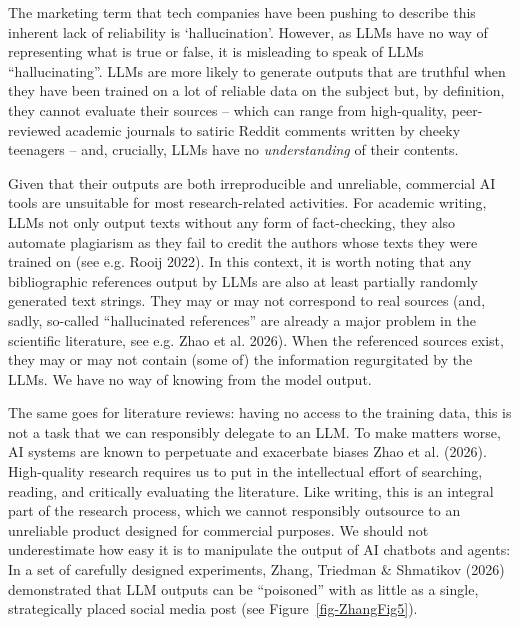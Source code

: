 \documentclass[
  letterpaper,
  DIV=11,
  numbers=noendperiod]{scrreprt}
\begin{document}
The marketing term that tech companies have been pushing to describe
this inherent lack of reliability is `hallucination'. However, as LLMs
have no way of representing what is true or false, it is misleading to
speak of LLMs ``hallucinating''. LLMs are more likely to generate
outputs that are truthful when they have been trained on a lot of
reliable data on the subject but, by definition, they cannot evaluate
their sources -- which can range from high-quality, peer-reviewed
academic journals to satiric Reddit comments written by cheeky teenagers
-- and, crucially, LLMs have no \emph{understanding} of their contents.

Given that their outputs are both irreproducible and unreliable,
commercial AI tools are unsuitable for most research-related activities.
For academic writing, LLMs not only output texts without any form of
fact-checking, they also automate plagiarism as they fail to credit the
authors whose texts they were trained on (see e.g. Rooij 2022). In this
context, it is worth noting that any bibliographic references output by
LLMs are also at least partially randomly generated text strings. They
may or may not correspond to real sources (and, sadly, so-called
``hallucinated references'' are already a major problem in the
scientific literature, see e.g. Zhao et al. 2026). When the referenced
sources exist, they may or may not contain (some of) the information
regurgitated by the LLMs. We have no way of knowing from the model
output.

The same goes for literature reviews: having no access to the training
data, this is not a task that we can responsibly delegate to an LLM. To
make matters worse, AI systems are known to perpetuate and exacerbate
biases Zhao et al. (2026). High-quality research requires us to put in
the intellectual effort of searching, reading, and critically evaluating
the literature. Like writing, this is an integral part of the research
process, which we cannot responsibly outsource to an unreliable product
designed for commercial purposes. We should not underestimate how easy
it is to manipulate the output of AI chatbots and agents: In a set of
carefully designed experiments, Zhang, Triedman \& Shmatikov (2026)
demonstrated that LLM outputs can be ``poisoned'' with as little as a
single, strategically placed social media post (see
Figure~\ref{fig-ZhangFig5}).
\end{document}
